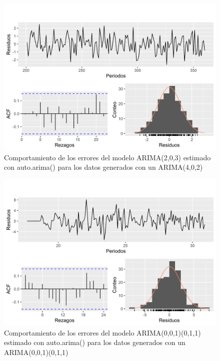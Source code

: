 \documentclass[
]{article}
\begin{document}
\begin{figure}[H]
\includegraphics[width=1\linewidth,height=1\textheight]{Tesis_files/figure-latex/errores_simulados_autoarima4-1} \caption{Comportamiento de los errores del modelo ARIMA(2,0,3) estimado con auto.arima() para los datos generados con un ARIMA(4,0,2)}\label{fig:errores_simulados_autoarima4}
\end{figure}

\begin{figure}[H]
\includegraphics[width=1\linewidth,height=1\textheight]{Tesis_files/figure-latex/errores_simulados_autoarima5-1} \caption{Comportamiento de los errores del modelo ARIMA(0,0,1)(0,1,1) estimado con auto.arima() para los datos generados con un ARIMA(0,0,1)(0,1,1)}\label{fig:errores_simulados_autoarima5}
\end{figure}
\end{document}
